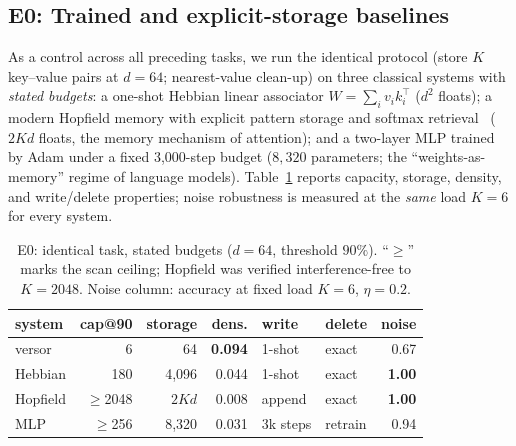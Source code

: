 \documentclass[10pt,twocolumn]{article}
\begin{document}
\subsection{E0: Trained and explicit-storage baselines}
\label{sec:e0}
As a control across all preceding tasks, we run the identical protocol
(store $K$ key--value pairs at $d{=}64$; nearest-value clean-up) on three
classical systems with \emph{stated budgets}: a one-shot Hebbian linear
associator $W=\sum_i v_i k_i^\top$ ($d^2$ floats); a modern Hopfield memory with
explicit pattern storage and softmax retrieval~\cite{ramsauer2020,hopfield1982}
($2Kd$ floats, the memory mechanism of attention); and a two-layer MLP trained by
Adam under a fixed 3{,}000-step budget ($8{,}320$ parameters; the
``weights-as-memory'' regime of language models). Table~\ref{tab:e0} reports
capacity, storage, density, and write/delete properties; noise robustness is
measured at the \emph{same} load $K{=}6$ for every system.

\begin{table}[t]
\centering
\caption{E0: identical task, stated budgets ($d{=}64$, threshold $90\%$).
``$\ge$'' marks the scan ceiling; Hopfield was verified interference-free to
$K{=}2048$. Noise column: accuracy at fixed load $K{=}6$, $\eta{=}0.2$.}
\label{tab:e0}
\small
\setlength{\tabcolsep}{3.4pt}
\begin{tabular}{lrrrllr}
\toprule
system & cap@90 & storage & dens. & write & delete & noise\\
\midrule
versor      & 6          & 64      & \textbf{0.094} & 1-shot & exact   & 0.67\\
Hebbian     & 180        & 4{,}096 & 0.044          & 1-shot & exact   & \textbf{1.00}\\
Hopfield    & $\ge$2048  & $2Kd$   & 0.008          & append & exact   & \textbf{1.00}\\
MLP         & $\ge$256   & 8{,}320 & 0.031          & 3k steps & retrain & 0.94\\
\bottomrule
\end{tabular}
\end{table}
\end{document}
